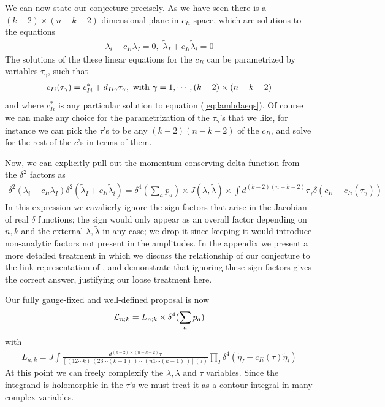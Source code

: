 \documentclass[12pt]{article}
\newcommand{\be}{\begin{eqnarray}}
\newcommand{\ee}{\end{eqnarray}}
\begin{document}
We can now state our conjecture precisely. As we have seen there is a $(k-2) \times (n - k - 2)$ dimensional plane in $c_{Ii}$ space, which are solutions to the
equations
\be
\label{eq:lambdaeqs}
 \lambda_i - c_{Ii} \lambda_I = 0, \,\, \tilde \lambda_I + c_{Ii} \tilde \lambda_i = 0                                                                                     \ee
The solutions of the these linear equations for the $c_{Ii}$ can be parametrized by variables $\tau_\gamma$, such that\be
c_{Ii}(\tau_\gamma) = c_{Ii}^* + d_{Ii \gamma} \tau_\gamma, \, \, {\rm with} \,\,  \gamma = 1, \cdots, (k-2) \times (n-k-2)
\ee
and where $c_{Ii}^*$ is any particular solution to equation (\ref{eq:lambdaeqs}).                                                                                                                                                                    Of course we can make any choice for the parametrization of the $\tau_\gamma$'s that                                                                                    we like, for instance we can pick the $\tau$'s to be any $(k-2) (n - k - 2)$ of the $c_{Ii}$, and solve for the rest of the $c$'s in
terms of them.

Now, we can explicitly pull out the momentum conserving delta function from the $\delta^2$ factors as
\be
\delta^{2}(\lambda_i - c_{Ii} \lambda_I) \delta^2(\tilde \lambda_I + c_{Ii} \tilde \lambda_i) = \delta^4(\sum_a p_a) \times J(\lambda,\tilde \lambda)
\times \int d^{(k-2)(n-k-2)} \tau_\gamma \delta(c_{Ii} - c_{Ii}(\tau_\gamma))                                                                                                  \ee
In this expression we cavalierly ignore the sign factors that arise in the Jacobian of real $\delta$ functions; the sign would only appear as an overall factor depending on $n,k$ and the external $\lambda,\tilde \lambda$ in any case; we drop it since keeping it would introduce non-analytic factors not present in the amplitudes. In the appendix we present a more detailed treatment in which we discuss the relationship of our conjecture to the link representation of \cite{ArkaniHamed:2009si}, and demonstrate that ignoring these sign factors gives the correct answer, justifying our loose treatment here.

Our fully gauge-fixed and well-defined proposal is now
\be
{\cal L}_{n;k} = L_{n;k} \times \delta^4(\sum_a p_a)
\ee
with
\be
 L_{n;k} = J \int
 \frac{d^{(k-2)\times(n-k-2)} \tau}{\left[(12\cdots k) \, (23\cdots
 (k+1)\, ) \, \cdots (n 1 \cdots (k-1)\,)\right](\tau)}
 \prod_I \delta^4(\tilde \eta_I + c_{Ii}(\tau) \tilde \eta_i)
\ee At this point we can freely complexify the $\lambda,\tilde
\lambda$ and $\tau$ variables. Since the integrand is holomorphic in
the $\tau$'s we must treat it as a contour integral in many complex
variables.
\end{document}
